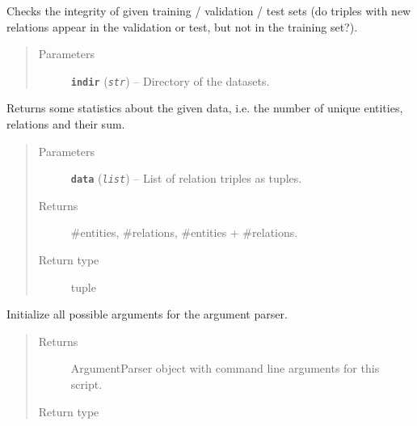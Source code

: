\documentclass[letterpaper,10pt,english]{sphinxmanual}
\begin{document}

\begin{fulllineitems}
\label{src.trans_e:src.trans_e.partition_data.check_set_integrity}
Checks the integrity of given training / validation / test sets (do triples with new relations appear in the
validation or test, but not in the training set?).
\begin{quote}\begin{description}
\item[{Parameters}] \leavevmode
\textbf{\texttt{indir}} (\emph{\texttt{str}}) -- Directory of the datasets.

\end{description}\end{quote}

\end{fulllineitems}


\begin{fulllineitems}
\label{src.trans_e:src.trans_e.partition_data.get_stats}
Returns some statistics about the given data, i.e. the number of unique entities, relations and
their sum.
\begin{quote}\begin{description}
\item[{Parameters}] \leavevmode
\textbf{\texttt{data}} (\emph{\texttt{list}}) -- List of relation triples as tuples.

\item[{Returns}] \leavevmode
\#entities, \#relations, \#entities + \#relations.

\item[{Return type}] \leavevmode
tuple

\end{description}\end{quote}

\end{fulllineitems}


\begin{fulllineitems}
\label{src.trans_e:src.trans_e.partition_data.init_argparse}
Initialize all possible arguments for the argument parser.
\begin{quote}\begin{description}
\item[{Returns}] \leavevmode
ArgumentParser object with command line arguments for this script.

\item[{Return type}] \leavevmode
{}

\end{description}\end{quote}

\end{fulllineitems}
\end{document}
